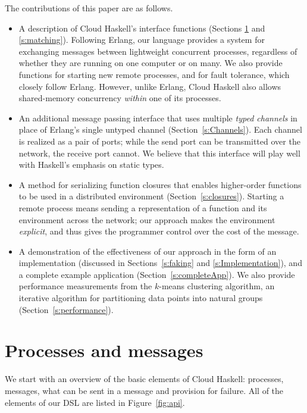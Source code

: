 \documentclass[preprint]{sigplanconf}
\begin{document}
The contributions of this paper are as follows.
\begin{itemize}
\item A description of Cloud Haskell's interface functions (Sections \ref{s:ProcessesAndMessages} and \ref{s:matching}). Following Erlang, our language provides a system for exchanging messages between lightweight concurrent processes, regardless of whether they are running on one computer or on many. We also provide functions for starting new remote processes, and for fault tolerance, which closely follow Erlang. 
However, unlike Erlang, Cloud Haskell also allows shared-memory concurrency \emph{within} one of its processes.

\item An additional message passing interface that uses multiple \emph{typed channels} in place of Erlang's single untyped channel (Section~\ref{s:Channels}).  Each channel is realized as a pair of ports; while the send port can be transmitted over the network, the receive port cannot. We believe that this interface will play well with Haskell's emphasis on static types.

\item A method for serializing function closures that enables higher-order functions to be used in a distributed environment (Section~\ref{s:closures}). Starting a remote process means sending a representation of a function and its environment across the network;  our approach makes the environment \emph{explicit}, and thus gives the programmer control over the cost of the message.

\item A demonstration of the effectiveness of our approach in the form of an implementation (discussed in Sections~\ref{s:faking} and \ref{s:Implementation}), and a complete example application (Section~\ref{s:completeApp}).
We also provide performance measurements from the $k$-means clustering algorithm, an iterative algorithm for partitioning data points into natural groups (Section~\ref{s:performance}). 
\end{itemize}
\pagebreak

\section{Processes and messages}
\label{s:ProcessesAndMessages}

We start with an overview of the basic elements of Cloud Haskell:
processes, messages, what can be sent in a message and provision for failure.
All of the elements of our DSL are listed in Figure~\ref{fig:api}.
\end{document}
